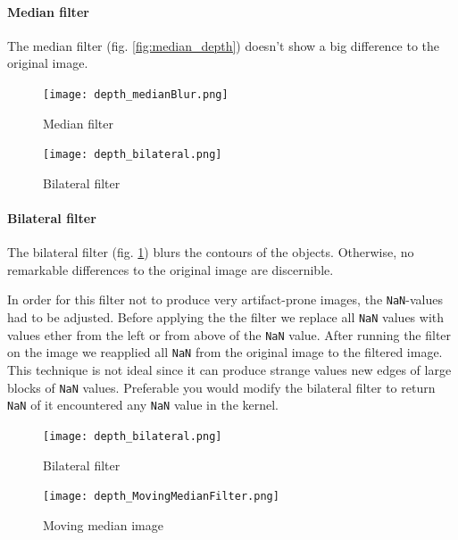 \documentclass[DIV12,a4paper]{scrartcl}
\begin{document}
\paragraph{Median filter}
The median filter (fig. \ref{fig:median_depth}) doesn't show a big difference to the original image.
\begin{figure}[h!tbp]
  \begin{minipage}{.5\textwidth}
  \centering
  \texttt{[image: depth\_medianBlur.png]}
  \caption{Median filter}
  \label{fig:median_depth}
\end{minipage}%
\begin{minipage}{.5\textwidth}
  \centering
  \texttt{[image: depth\_bilateral.png]}
  \caption{Bilateral filter}
  \label{fig:bilateral_depth}
\end{minipage}
\end{figure}

\paragraph{Bilateral filter}
The bilateral filter (fig. \ref{fig:bilateral_depth}) blurs the contours of the objects. Otherwise, no remarkable differences to the original image are discernible.\par
In order for this filter not to produce very artifact-prone images, the \texttt{NaN}-values had to be adjusted. Before applying the the filter we replace all \texttt{NaN} values with values ether from the left or from above of the \texttt{NaN} value. After running the filter on the image we reapplied all \texttt{NaN} from the original image to the filtered image. This technique is not ideal since it can produce strange values new edges of large blocks of \texttt{NaN} values. Preferable you would modify the bilateral filter to return \texttt{NaN} of it encountered any \texttt{NaN} value in the kernel. %
\begin{figure}[h!tbp]
  \begin{minipage}{.5\textwidth}
    \centering
    \texttt{[image: depth\_bilateral.png]}
    \caption{Bilateral filter}
    \label{fig:bilateral_depth}
  \end{minipage}%
  \begin{minipage}{.5\textwidth}
    \centering
    \texttt{[image: depth\_MovingMedianFilter.png]}
    \caption{Moving median image}
    \label{fig:moving_median_depth}
  \end{minipage}
\end{figure}
\end{document}

